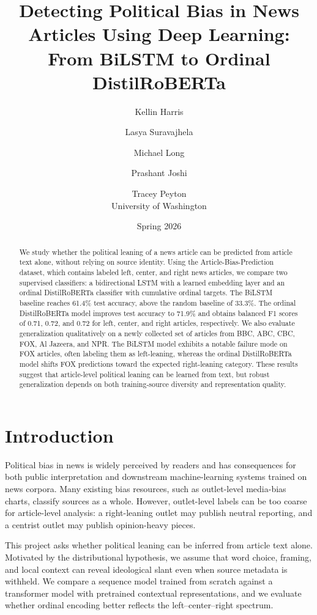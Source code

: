 \documentclass[10pt,twocolumn]{article}
\title{Detecting Political Bias in News Articles Using Deep Learning:\\
From BiLSTM to Ordinal DistilRoBERTa}
\author{
Kellin Harris \and
Lasya Suravajhela \and
Michael Long \and
Prashant Joshi \and
Tracey Peyton\\
University of Washington
}
\date{Spring 2026}
\begin{document}
\maketitle

\begin{abstract}
We study whether the political leaning of a news article can be predicted from
article text alone, without relying on source identity. Using the
Article-Bias-Prediction dataset, which contains labeled left, center, and right
news articles, we compare two supervised classifiers: a bidirectional LSTM with
a learned embedding layer and an ordinal DistilRoBERTa classifier with
cumulative ordinal targets. The BiLSTM baseline reaches 61.4\% test accuracy,
above the random baseline of 33.3\%. The ordinal DistilRoBERTa model improves
test accuracy to 71.9\% and obtains balanced F1 scores of 0.71, 0.72, and 0.72
for left, center, and right articles, respectively. We also evaluate
generalization qualitatively on a newly collected set of articles from BBC,
ABC, CBC, FOX, Al Jazeera, and NPR. The BiLSTM model exhibits a notable
failure mode on FOX articles, often labeling them as left-leaning, whereas the
ordinal DistilRoBERTa model shifts FOX predictions toward the expected
right-leaning category. These results suggest that article-level political
leaning can be learned from text, but robust generalization depends on both
training-source diversity and representation quality.
\end{abstract}

\section{Introduction}

Political bias in news is widely perceived by readers and has consequences for
both public interpretation and downstream machine-learning systems trained on
news corpora. Many existing bias resources, such as outlet-level media-bias
charts, classify sources as a whole. However, outlet-level labels can be too
coarse for article-level analysis: a right-leaning outlet may publish neutral
reporting, and a centrist outlet may publish opinion-heavy pieces.

This project asks whether political leaning can be inferred from article text
alone. Motivated by the distributional hypothesis, we assume that word choice,
framing, and local context can reveal ideological slant even when source
metadata is withheld. We compare a sequence model trained from scratch against
a transformer model with pretrained contextual representations, and we evaluate
whether ordinal encoding better reflects the left--center--right spectrum.
\end{document}
